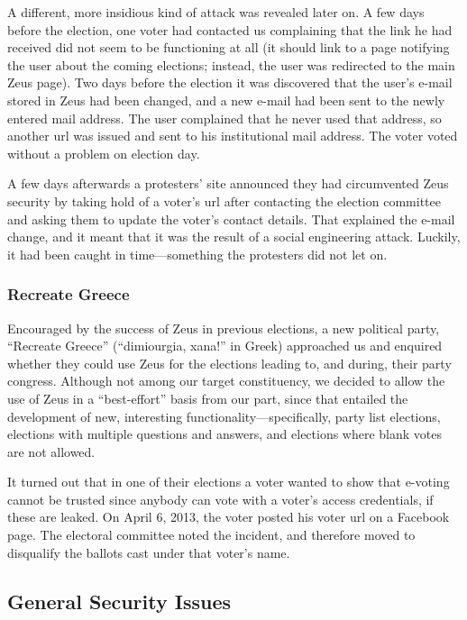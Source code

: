 \documentclass[letterpaper,10pt]{article}
\begin{document}
A different, more insidious kind of attack was revealed later on. A
few days before the election, one voter had contacted us complaining
that the link he had received did not seem to be functioning at all
(it should link to a page notifying the user about the coming
elections; instead, the user was redirected to the main Zeus page).
Two days before the election it was discovered that the user's e-mail
stored in Zeus had been changed, and a new e-mail had been sent to the
newly entered mail address. The user complained that he never used
that address, so another {\sc url} was issued and sent to his institutional
mail address. The voter voted without a problem on election day.

A few days afterwards a protesters' site announced they had
circumvented Zeus security by taking hold of a voter's {\sc url} after
contacting the election committee and asking them to update the
voter's contact details. That explained the e-mail change, and it
meant that it was the result of a social engineering attack. Luckily,
it had been caught in time---something the protesters did not let on.


\subsubsection{Recreate Greece}

Encouraged by the success of Zeus in previous elections, a new
political party, ``Recreate Greece'' (``dimiourgia, xana!'' in Greek)
approached us and enquired whether they could use Zeus for the
elections leading to, and during, their party congress. Although not
among our target constituency, we decided to allow the use of Zeus in
a ``best-effort'' basis from our part, since that entailed the
development of new, interesting functionality---specifically, party
list elections, elections with multiple questions and answers, and
elections where blank votes are not allowed.

It turned out that in one of their elections a voter wanted to show
that e-voting cannot be trusted since anybody can vote with a voter's
access credentials, if these are leaked. On April 6, 2013, the voter
posted his voter {\sc url} on a Facebook page. The electoral committee noted
the incident, and therefore moved to disqualify the ballots cast under
that voter's name. 

\subsection{General Security Issues}
\label{ssec:security-discussion}
\end{document}
